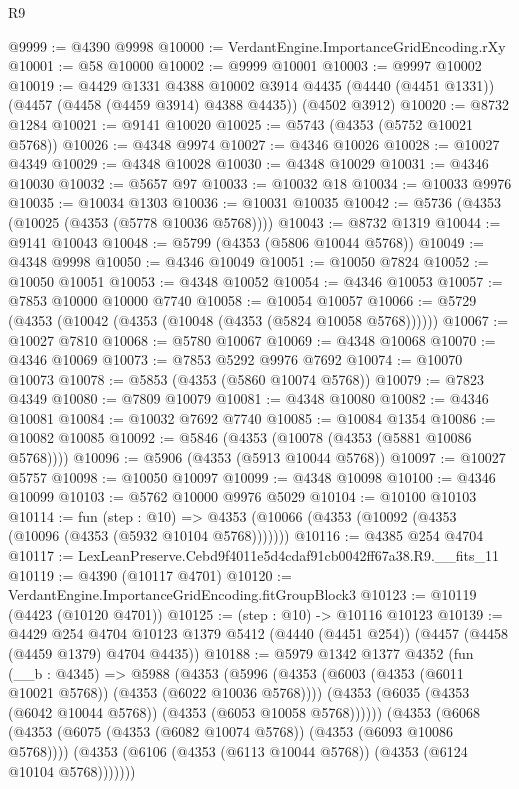 \begin{lexlean}{R9}
\begin{coremodule}
@9999 := @4390 @9998
@10000 := VerdantEngine.ImportanceGridEncoding.rXy
@10001 := @58 @10000
@10002 := @9999 @10001
@10003 := @9997 @10002
@10019 := @4429
    @1331
    @4388
    @10002
    @3914
    @4435
    (@4440 (@4451 @1331))
    (@4457 (@4458 (@4459 @3914) @4388 @4435))
    (@4502 @3912)
@10020 := @8732 @1284
@10021 := @9141 @10020
@10025 := @5743 (@4353 (@5752 @10021 @5768))
@10026 := @4348 @9974
@10027 := @4346 @10026
@10028 := @10027 @4349
@10029 := @4348 @10028
@10030 := @4348 @10029
@10031 := @4346 @10030
@10032 := @5657 @97
@10033 := @10032 @18
@10034 := @10033 @9976
@10035 := @10034 @1303
@10036 := @10031 @10035
@10042 := @5736 (@4353 (@10025 (@4353 (@5778 @10036 @5768))))
@10043 := @8732 @1319
@10044 := @9141 @10043
@10048 := @5799 (@4353 (@5806 @10044 @5768))
@10049 := @4348 @9998
@10050 := @4346 @10049
@10051 := @10050 @7824
@10052 := @10050 @10051
@10053 := @4348 @10052
@10054 := @4346 @10053
@10057 := @7853 @10000 @10000 @7740
@10058 := @10054 @10057
@10066 := @5729 (@4353 (@10042 (@4353 (@10048 (@4353 (@5824 @10058 @5768))))))
@10067 := @10027 @7810
@10068 := @5780 @10067
@10069 := @4348 @10068
@10070 := @4346 @10069
@10073 := @7853 @5292 @9976 @7692
@10074 := @10070 @10073
@10078 := @5853 (@4353 (@5860 @10074 @5768))
@10079 := @7823 @4349
@10080 := @7809 @10079
@10081 := @4348 @10080
@10082 := @4346 @10081
@10084 := @10032 @7692 @7740
@10085 := @10084 @1354
@10086 := @10082 @10085
@10092 := @5846 (@4353 (@10078 (@4353 (@5881 @10086 @5768))))
@10096 := @5906 (@4353 (@5913 @10044 @5768))
@10097 := @10027 @5757
@10098 := @10050 @10097
@10099 := @4348 @10098
@10100 := @4346 @10099
@10103 := @5762 @10000 @9976 @5029
@10104 := @10100 @10103
@10114 := fun (step : @10) =>
  @4353 (@10066 (@4353 (@10092 (@4353 (@10096 (@4353 (@5932 @10104 @5768)))))))
@10116 := @4385 @254 @4704
@10117 := LexLeanPreserve.Cebd9f4011e5d4cdaf91cb0042ff67a38.R9.__fits_11
@10119 := @4390 (@10117 @4701)
@10120 := VerdantEngine.ImportanceGridEncoding.fitGroupBlock3
@10123 := @10119 (@4423 (@10120 @4701))
@10125 := (step : @10) -> @10116 @10123
@10139 := @4429
    @254
    @4704
    @10123
    @1379
    @5412
    (@4440 (@4451 @254))
    (@4457 (@4458 (@4459 @1379) @4704 @4435))
@10188 := @5979
    @1342
    @1377
    @4352
    (fun (__b : @4345) =>
    @5988
      (@4353
        (@5996
          (@4353 (@6003 (@4353 (@6011 @10021 @5768)) (@4353 (@6022 @10036 @5768))))
          (@4353 (@6035 (@4353 (@6042 @10044 @5768)) (@4353 (@6053 @10058 @5768))))))
      (@4353
        (@6068
          (@4353 (@6075 (@4353 (@6082 @10074 @5768)) (@4353 (@6093 @10086 @5768))))
          (@4353 (@6106 (@4353 (@6113 @10044 @5768)) (@4353 (@6124 @10104 @5768)))))))

\end{coremodule}
\end{lexlean}
